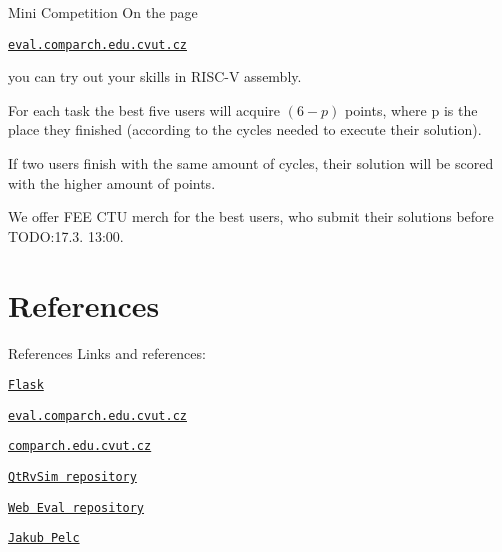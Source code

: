\documentclass{beamer}
\begin{document}
	\begin{frame}{Mini Competition}
		On the page \par
		{\centering \texttt{\href{http://eval.comparch.edu.cvut.cz}{eval.comparch.edu.cvut.cz}} \par}
		you can try out your skills in RISC-V assembly. \par

		For each task the best five users will acquire $(6 - p)$ points, where p is the place they finished (according to the cycles needed to execute their solution).\par
		
		If two users finish with the same amount of cycles, their solution will be scored with the higher amount of points. \par

		We offer FEE CTU merch for the best users, who submit their solutions before TODO:17.3. 13:00. \par
	\end{frame}

	\section{References}

	\begin{frame}{References}
		Links and references: \par
		{\centering \texttt{\href{https://flask.palletsprojects.com/en/3.0.x/}{Flask}} \par}
		{\centering \texttt{\href{http://eval.comparch.edu.cvut.cz}{eval.comparch.edu.cvut.cz}} \par}
		{\centering \texttt{\href{http://comparch.edu.cvut.cz}{comparch.edu.cvut.cz}} \par}
		{\centering \texttt{\href{https://github.com/cvut/qtrvsim}{QtRvSim repository}} \par}
		{\centering \texttt{\href{https://gitlab.fel.cvut.cz/b35apo/qtrvsim-eval-web}{Web Eval repository}} \par}
		{\centering \texttt{\href{https://swpelc.eu}{Jakub Pelc}} \par}
	\end{frame}
\end{document}
